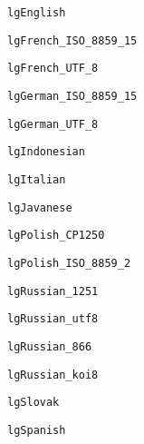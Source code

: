 \documentclass{report}
\begin{document}
\begin{list}{}
\begin{description}
\item[\texttt{lgEnglish}] \label{PasDoc_Languages-lgEnglish}
\index{}
 
\item[\texttt{lgFrench{\_}ISO{\_}8859{\_}15}] \label{PasDoc_Languages-lgFrench_ISO_8859_15}
\index{}
 
\item[\texttt{lgFrench{\_}UTF{\_}8}] \label{PasDoc_Languages-lgFrench_UTF_8}
\index{}
 
\item[\texttt{lgGerman{\_}ISO{\_}8859{\_}15}] \label{PasDoc_Languages-lgGerman_ISO_8859_15}
\index{}
 
\item[\texttt{lgGerman{\_}UTF{\_}8}] \label{PasDoc_Languages-lgGerman_UTF_8}
\index{}
 
\item[\texttt{lgIndonesian}] \label{PasDoc_Languages-lgIndonesian}
\index{}
 
\item[\texttt{lgItalian}] \label{PasDoc_Languages-lgItalian}
\index{}
 
\item[\texttt{lgJavanese}] \label{PasDoc_Languages-lgJavanese}
\index{}
 
\item[\texttt{lgPolish{\_}CP1250}] \label{PasDoc_Languages-lgPolish_CP1250}
\index{}
 
\item[\texttt{lgPolish{\_}ISO{\_}8859{\_}2}] \label{PasDoc_Languages-lgPolish_ISO_8859_2}
\index{}
 
\item[\texttt{lgRussian{\_}1251}] \label{PasDoc_Languages-lgRussian_1251}
\index{}
 
\item[\texttt{lgRussian{\_}utf8}] \label{PasDoc_Languages-lgRussian_utf8}
\index{}
 
\item[\texttt{lgRussian{\_}866}] \label{PasDoc_Languages-lgRussian_866}
\index{}
 
\item[\texttt{lgRussian{\_}koi8}] \label{PasDoc_Languages-lgRussian_koi8}
\index{}
 
\item[\texttt{lgSlovak}] \label{PasDoc_Languages-lgSlovak}
\index{}
 
\item[\texttt{lgSpanish}] \label{PasDoc_Languages-lgSpanish}
\index{}
 

\end{description}
\end{list}
\end{document}
